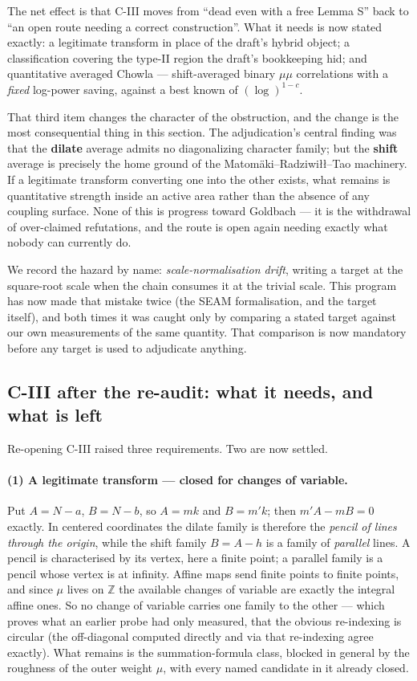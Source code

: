 \documentclass[11pt,a4paper]{article}
\theoremstyle{plain}
\theoremstyle{definition}
\begin{document}
The net effect is that C-III moves from ``dead even with a free
Lemma S'' back to ``an open route needing a correct construction''.
What it needs is now stated exactly: a legitimate transform in place
of the draft's hybrid object; a classification covering the type-II
region the draft's bookkeeping hid; and quantitative averaged Chowla
--- shift-averaged binary $\mu\mu$ correlations with a \emph{fixed}
log-power saving, against a best known of $(\log)^{1-c}$.

That third item changes the character of the obstruction, and the
change is the most consequential thing in this section. The
adjudication's central finding was that the \textbf{dilate} average
admits no diagonalizing character family; but the \textbf{shift}
average is precisely the home ground of the Matomäki--Radziwi\l\l--Tao
machinery. If a legitimate transform converting one into the other
exists, what remains is quantitative strength inside an active area
rather than the absence of any coupling surface. None of this is
progress toward Goldbach --- it is the withdrawal of over-claimed
refutations, and the route is open again needing exactly what nobody
can currently do.

We record the hazard by name: \emph{scale-normalisation drift},
writing a target at the square-root scale when the chain consumes it
at the trivial scale. This program has now made that mistake twice
(the SEAM formalisation, and the target itself), and both times it was
caught only by comparing a stated target against our own measurements
of the same quantity. That comparison is now mandatory before any
target is used to adjudicate anything.

\subsection{C-III after the re-audit: what it needs, and what is left}
\label{sec:c3state}

Re-opening C-III raised three requirements. Two are now settled.

\paragraph{(1) A legitimate transform --- closed for changes of
variable.} Put $A = N-a$, $B = N-b$, so $A = mk$ and $B = m'k$; then
$m'A - mB = 0$ exactly. In centered coordinates the dilate family is
therefore the \emph{pencil of lines through the origin}, while the
shift family $B = A - h$ is a family of \emph{parallel} lines. A
pencil is characterised by its vertex, here a finite point; a parallel
family is a pencil whose vertex is at infinity. Affine maps send
finite points to finite points, and since $\mu$ lives on $\mathbb Z$
the available changes of variable are exactly the integral affine
ones. So no change of variable carries one family to the other --- which
proves what an earlier probe had only measured, that the obvious
re-indexing is circular (the off-diagonal computed directly and via
that re-indexing agree exactly). What remains is the summation-formula
class, blocked in general by the roughness of the outer weight $\mu$,
with every named candidate in it already closed.
\end{document}
